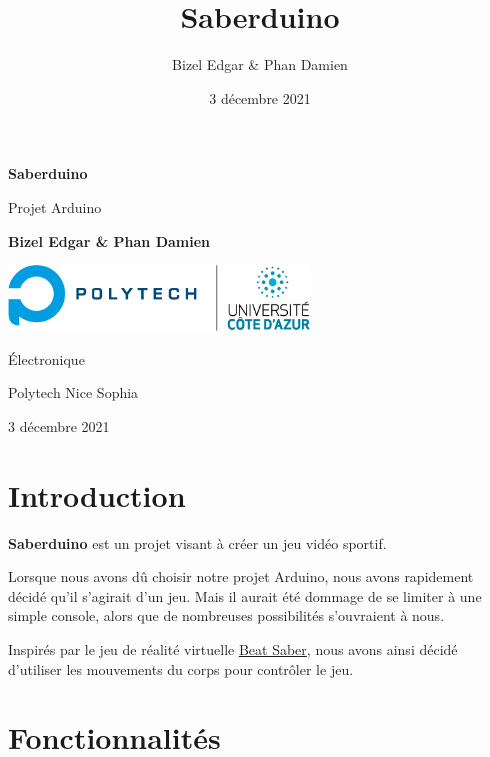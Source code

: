 \documentclass[12pt,twoside]{article}
\title{Saberduino}
\author{Bizel Edgar \& Phan Damien}
\date{3 décembre 2021}
\begin{document}
\begin{titlepage}
	\begin{center}
		\vspace*{1cm}

		\Huge
		\textbf{Saberduino}

		\vspace{0.5cm}
		\LARGE
		Projet Arduino

		\vspace{1.5cm}

		\textbf{Bizel Edgar \& Phan Damien}

		\vfill

		\vspace{0.8cm}

		\includegraphics[width=0.6\textwidth]{logo_polytech.png}

		\vspace{0.8cm}

		\Large
		Électronique

		Polytech Nice Sophia

		3 décembre 2021

	\end{center}
\end{titlepage}


\tableofcontents

\vspace{0.5cm}

\section{Introduction}%
\label{sec:introduction}

\textbf{Saberduino} est un projet visant à créer un jeu vidéo sportif.

Lorsque nous avons dû choisir notre projet Arduino, nous avons rapidement décidé qu'il
s'agirait d'un jeu. Mais il aurait été dommage de se limiter à une simple console, alors
que de nombreuses possibilités s'ouvraient à nous.

Inspirés par le jeu de réalité virtuelle \href{https://store.steampowered.com/app/620980/Beat_Saber}{Beat
Saber}, nous avons ainsi décidé d'utiliser les mouvements du corps pour contrôler le jeu.

\section{Fonctionnalités}%
\label{sec:fonctionnalites}
\end{document}

